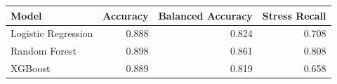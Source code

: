 \begin{tabular}{lrrr}
\toprule
Model & Accuracy & Balanced Accuracy & Stress Recall \\
\midrule
Logistic Regression & 0.888 & 0.824 & 0.708 \\
Random Forest & 0.898 & 0.861 & 0.808 \\
XGBoost & 0.889 & 0.819 & 0.658 \\
\bottomrule
\end{tabular}
